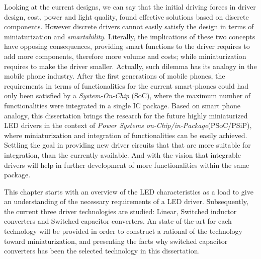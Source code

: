 Looking at the current designs, we can say that the initial driving forces in driver design, cost, power and light quality, found effective solutions based on discrete components. However discrete drivers cannot easily satisfy the design in terms of miniaturization and \emph{smartability}. Literally, the implications of these two concepts have opposing consequences, providing smart functions to the driver requires to add more components, therefore more volume and costs; while miniaturization requires to make the driver smaller. Actually, such dilemma has its analogy in the mobile phone industry. After the first generations of mobile phones, the requirements in terms of functionalities for the current smart-phones could had only been satisfied by a \emph{System-On-Chip} (SoC), where the maximum number of functionalities were integrated in a single IC package. Based on smart phone analogy, this dissertation brings the research for the future highly miniaturized LED drivers in the context of \emph{Power Systems on-Chip/in-Package}(PSoC/PSiP), where miniaturization and integration of functionalities can be easily achieved. Settling the goal in providing new driver circuits that that are more suitable for integration, than the currently available. And with the vision that integrable drivers will help in further development of more functionalities within the same package.

This chapter starts with an overview of the LED characteristics as a load to give an understanding of the necessary requirements of a LED driver. Subsequently, the current three driver technologies are studied: Linear, Switched inductor converters and Switched capacitor converters. An state-of-the-art for each technology will be provided in order to construct a rational of the technology toward miniaturization, and presenting the facts why switched capacitor converters has been the selected technology in this dissertation.



